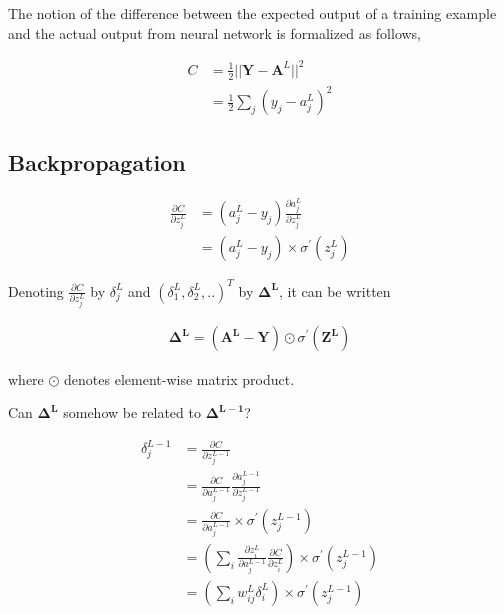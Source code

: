 \documentclass[11pt, a4paper]{article}
\begin{document}
The notion of the difference between the expected output of a training example and the actual output from neural network is formalized as follows,

\begin{align*}
	C & = \frac{1}{2} ||\boldsymbol{Y} - \boldsymbol{A}^L||^2 \\
	  & = \frac{1}{2}\sum_j (y_j - a^L_j)^2                   
\end{align*}

\subsection {Backpropagation}

\begin{align*}
	\frac{\partial C}{\partial z^L_j} & = (a^L_j - y_j) \frac{\partial a^L_j}{\partial z^L_j} \\
	                                  & = (a^L_j - y_j) \times \sigma^{'} (z^L_j)             
\end{align*}

Denoting $\frac{\partial C}{\partial z^L_j}$ by $\delta^L_j$ and $(\delta^L_1, \delta^L_2, .. )^T$ by $\boldsymbol{\Delta^L}$, it can be written

\begin{align}
	\boldsymbol{\Delta^L} = (\boldsymbol{A^L} - \boldsymbol{Y}) \odot \sigma^{'}(\boldsymbol{Z^L}) 
\end{align}

where $\odot$ denotes element-wise matrix product.

Can $\boldsymbol{\Delta^L}$ somehow be related to $\boldsymbol{\Delta^{L-1}}$?

\begin{align*}
	\delta^{L-1}_j & = \frac{\partial C}{\partial z^{L-1}_j}                                                                                              \\
	               & = \frac{\partial C}{\partial a^{L-1}_j} \frac{\partial a^{L-1}_j}{\partial z^{L-1}_j}                                                \\
	               & = \frac{\partial C}{\partial a^{L-1}_j} \times \sigma^{'}(z^{L-1}_j)                                                                 \\
	               & = \left( \sum_i \frac{\partial z^{L}_i}{\partial a^{L-1}_j} \frac{\partial C}{\partial z^{L}_i} \right) \times \sigma^{'}(z^{L-1}_j) \\
	               & = \left( \sum_i w^L_{ij} \delta^L_i \right) \times \sigma^{'}(z^{L-1}_j)                                                             \\
\end{align*}
\end{document}
